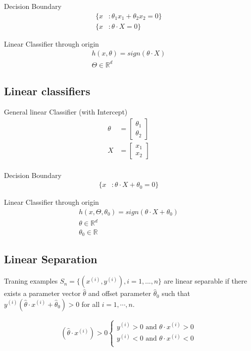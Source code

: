 Decision Boundary
\begin{align*}
\{x&: \theta_1 x_1 + \theta_2 x_2 = 0\}\\
\{x&: \theta \cdot X=0\}
\end{align*}

Linear Classifier through origin
\begin{align*}
h(x,\theta)=sign(\theta \cdot X)\\
\Theta \in \mathbb{R}^d
\end{align*}

\subsection{Linear classifiers}
General linear Classifier (with Intercept)
\begin{align*}
\theta &= \begin{bmatrix}
           \theta_{1} \\
           \theta_{2}
         \end{bmatrix}\\
X &= \begin{bmatrix}
           x_{1} \\
           x_{2}
         \end{bmatrix}\\
\end{align*}

Decision Boundary
\begin{align*}
\{x&: \theta \cdot X + \theta_0 = 0\}
\end{align*}

Linear Classifier through origin
\begin{align*}
h(x,\Theta, \theta_0)=sign(\theta \cdot X + \theta_0)\\
\theta \in \mathbb{R}^d\\
\theta_0 \in \mathbb{R}
\end{align*}

\subsection{Linear Separation}

Traning examples $S_n = \{(x^{(i)}, y^{(i)}), i=1,...,n\}$ are linear separable if there exists a parameter vector $\hat{\theta}$ and offset parameter $\hat{\theta}_0$ such that $y^{(i)}(\hat{\theta} \cdot x^{(i)} + \hat{\theta}_0 )>0$ for all $i=1,\cdots,n$.

\begin{align*}
(\hat{\theta} \cdot x^{(i)})>0
	\begin{cases}
		 y^{(i)}>0 \text{ and } \theta \cdot x^{(i)} >0\\
		 y^{(i)}<0 \text{ and } \theta \cdot x^{(i)} <0\\
	\end{cases}
\end{align*}

